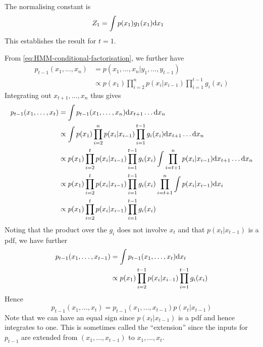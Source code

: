 \begin{exenumerate}
\begin{solution}
  The normalising constant is
  \begin{align}
    Z_1 & = \int  p(x_1) g_1(x_1) \mathrm{d} x_1
  \end{align}
  This establishes the result for $t=1$.

  From \eqref{eq:HMM-conditional-factorisation}, we further have
   \begin{align}
     p_{t-1}(x_1, \ldots, x_n) & = p(x_1, \ldots, x_n | y_1, \ldots, y_{t-1})\\
     &\propto p(x_1) \prod_{i=2}^n p(x_i|x_{i-1}) \prod_{i=1}^{t-1} g_i(x_i)
   \end{align}
   Integrating out $x_{t+1}, \ldots, x_n$ thus gives
   \begin{align}
     p_{t-1}(x_1, \ldots, x_t) & = \int p_{t-1}(x_1, \ldots, x_n) \mathrm{d} x_{t+1} \ldots \mathrm{d} x_n\\
     &\propto \int p(x_1) \prod_{i=2}^n p(x_i|x_{i-1}) \prod_{i=1}^{t-1} g_i(x_i)\mathrm{d} x_{t+1} \ldots \mathrm{d} x_n\\
     & \propto  p(x_1) \prod_{i=2}^t p(x_i|x_{i-1}) \prod_{i=1}^{t-1} g_i(x_i) \int \prod_{i=t+1}^n p(x_i|x_{i-1}) \mathrm{d} x_{t+1} \ldots \mathrm{d} x_n\\
     & \propto  p(x_1) \prod_{i=2}^t p(x_i|x_{i-1}) \prod_{i=1}^{t-1} g_i(x_i) \prod_{i=t+1}^n \int p(x_i|x_{i-1}) \mathrm{d} x_i\\
     & \propto  p(x_1) \prod_{i=2}^t p(x_i|x_{i-1}) \prod_{i=1}^{t-1} g_i(x_i)
   \end{align}
    Noting that the product over the $g_i$ does not involve $x_t$ and
    that $p(x_t | x_{t-1})$ is a pdf, we have further
    \begin{align}
      p_{t-1}(x_1, \ldots, x_{t-1}) &=\int  p_{t-1}(x_1, \ldots, x_t) \mathrm{d} x_t\\
      &  \propto p(x_1) \prod_{i=2}^{t-1} p(x_i|x_{i-1}) \prod_{i=1}^{t-1} g_i(x_i)
    \end{align}
    Hence
    \begin{equation}
      p_{t-1}(x_1, \ldots, x_t) =  p_{t-1}(x_1, \ldots, x_{t-1}) p(x_t|x_{t-1})
    \end{equation}
    Note that we can have an equal sign since $p(x_t|x_{t-1})$ is a
    pdf and hence integrates to one. This is sometimes called the
    ``extension'' since the inputs for $p_{t-1}$ are extended from
    $(x_1, \ldots, x_{t-1})$ to $x_1, \ldots, x_t$.
  

\end{solution}
\end{exenumerate}
